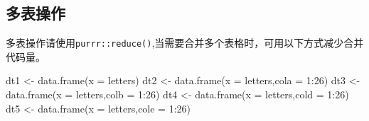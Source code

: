 \documentclass[
]{book}
\newenvironment{Shaded}{\begin{snugshade}}{\end{snugshade}}
\newcommand{\AttributeTok}[1]{\textcolor[rgb]{0.77,0.63,0.00}{#1}}
\newcommand{\DecValTok}[1]{\textcolor[rgb]{0.00,0.00,0.81}{#1}}
\newcommand{\FunctionTok}[1]{\textcolor[rgb]{0.00,0.00,0.00}{#1}}
\newcommand{\NormalTok}[1]{#1}
\newcommand{\OtherTok}[1]{\textcolor[rgb]{0.56,0.35,0.01}{#1}}
\newcommand{\SpecialCharTok}[1]{\textcolor[rgb]{0.00,0.00,0.00}{#1}}
\begin{document}
\hypertarget{ux591aux8868ux64cdux4f5c}{%
\subsection{多表操作}\label{ux591aux8868ux64cdux4f5c}}

多表操作请使用\texttt{purrr::reduce()},当需要合并多个表格时，可用以下方式减少合并代码量。

\begin{Shaded}
\begin{Highlighting}[]
\NormalTok{dt1 }\OtherTok{\textless{}{-}} \FunctionTok{data.frame}\NormalTok{(}\AttributeTok{x =}\NormalTok{ letters)}
\NormalTok{dt2 }\OtherTok{\textless{}{-}} \FunctionTok{data.frame}\NormalTok{(}\AttributeTok{x =}\NormalTok{ letters,}\AttributeTok{cola =} \DecValTok{1}\SpecialCharTok{:}\DecValTok{26}\NormalTok{)}
\NormalTok{dt3 }\OtherTok{\textless{}{-}} \FunctionTok{data.frame}\NormalTok{(}\AttributeTok{x =}\NormalTok{ letters,}\AttributeTok{colb =} \DecValTok{1}\SpecialCharTok{:}\DecValTok{26}\NormalTok{)}
\NormalTok{dt4 }\OtherTok{\textless{}{-}} \FunctionTok{data.frame}\NormalTok{(}\AttributeTok{x =}\NormalTok{ letters,}\AttributeTok{cold =} \DecValTok{1}\SpecialCharTok{:}\DecValTok{26}\NormalTok{)}
\NormalTok{dt5 }\OtherTok{\textless{}{-}} \FunctionTok{data.frame}\NormalTok{(}\AttributeTok{x =}\NormalTok{ letters,}\AttributeTok{cole =} \DecValTok{1}\SpecialCharTok{:}\DecValTok{26}\NormalTok{)}


\end{Highlighting}
\end{Shaded}
\end{document}
